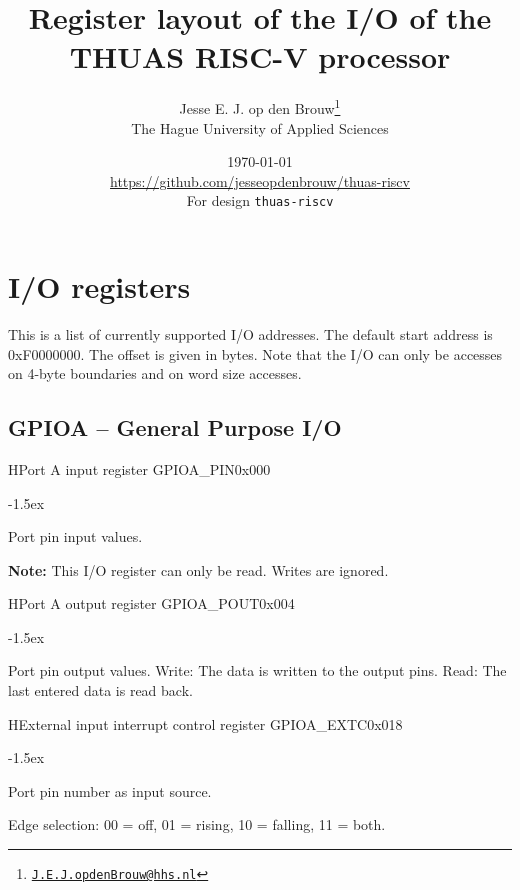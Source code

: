 \documentclass[12pt]{article}
\author{Jesse E. J. op den Brouw\thanks{\href{mailto:J.E.J.opdenBrouw@hhs.nl}{\texttt{J.E.J.opdenBrouw@hhs.nl}}}\\[2ex]The Hague University of Applied Sciences}
\title{Register layout of the I/O of the THUAS RISC-V processor}
\date{\today\\[2ex]\normalsize\url{https://github.com/jesseopdenbrouw/thuas-riscv}\\[2ex]For design \texttt{thuas-riscv}}
\begin{document}
\appendix
\setcounter{section}{2}

\section{I/O registers}
\label{sec:ioregisters}
This is a list of currently supported I/O addresses. 
The default start address is 0xF0000000. The offset is given in bytes. Note that the I/O can only be accesses on 4-byte boundaries and on word size accesses.


\subsection{GPIOA -- General Purpose I/O}

\begin{register}{H}{Port A input register GPIOA\_PIN}{0x000}%
\label{pinx}%
\regnewline%
\end{register}
\begin{regdesc}[0.6\textwidth]\begin{reglist}[000000]
\itemsep-1.5ex
\item[PIN] Port pin input values.
\end{reglist}\end{regdesc}
\textbf{Note:} This I/O register can only be read. Writes are ignored.

\begin{register}{H}{Port A output register GPIOA\_POUT}{0x004}%
\label{poutx}%
\regnewline%
\end{register}
\begin{regdesc}[0.6\textwidth]\begin{reglist}[000000]
\itemsep-1.5ex
\item[POUT] Port pin output values. Write: The data is written to the output pins. Read: The last entered data is read back.
\end{reglist}\end{regdesc}

\begin{register}{H}{External input interrupt control register GPIOA\_EXTC}{0x018}%
\label{extc}%
%
%
%
\regnewline%
\end{register}
\begin{regdesc}[0.7\textwidth]\begin{reglist}[000000]
\itemsep-1.5ex
\item[PINNR] Port pin number as input source.
\item[EDGE] Edge selection: 00 = off, 01 = rising, 10 = falling, 11 = both. 
\end{reglist}\end{regdesc}
\end{document}
